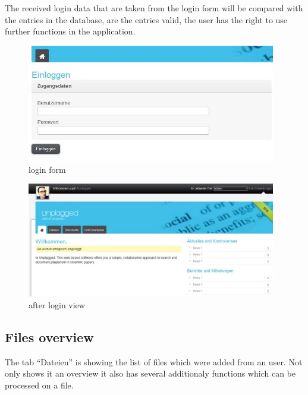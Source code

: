 The received login data that are taken from the login form will be compared with the entries in the database, are the 
entries valid, the user has the right to use further functions in the application.

\begin{figure}[!ht]
  \centering
    \includegraphics[width=0.97\textwidth]{images/basic_functionalities/login_form.jpg}
  \caption{login form}
  \label{fig:einloggen}
\end{figure}

\begin{figure}[!ht]
  \centering
    \includegraphics[width=0.97\textwidth]{images/basic_functionalities/after_login.jpg}
  \caption{after login view}
  \label{fig:einloggen}
\end{figure}

\subsection{Files overview}

The tab \enquote{Dateien} is showing the list of files which were added from an user. Not only shows it an overview it 
also has several additionaly functions which can be processed on a file.

